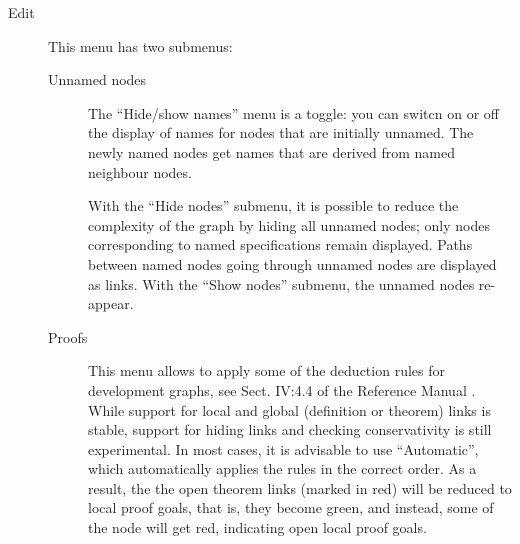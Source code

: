 \documentclass{article}
\begin{document}
\begin{description}
\item[Edit] This menu has two submenus:
\begin{description}
\item[Unnamed nodes] 
The ``Hide/show names'' menu is a toggle:
you can switcn on or off the display of names for nodes that
are initially unnamed. The newly named nodes get names that
are derived from named neighbour nodes.

With the ``Hide nodes'' submenu, it is possible
to reduce the complexity of the graph by hiding all unnamed nodes;
only nodes corresponding to named specifications remain displayed.
Paths between named nodes going through unnamed nodes
are displayed as links. With the ``Show nodes'' submenu, the unnamed
nodes re-appear.
\item[Proofs] This menu allows to apply some of the deduction rules
  for development graphs, see Sect. IV:4.4 of the \CASL Reference
  Manual \cite{CASL/RefManual}. While support for local and global
  (definition or theorem) links is stable, support for hiding links
  and checking conservativity is still experimental. In most cases, it is
  advisable to use ``Automatic'', which automatically applies the
  rules in the correct order. As a result, the the open theorem links
  (marked in red) will be reduced to local proof goals, that is, they
  become green, and instead, some of the node will get red, indicating
  open local proof goals.


\end{description}
\end{description}
\end{document}
